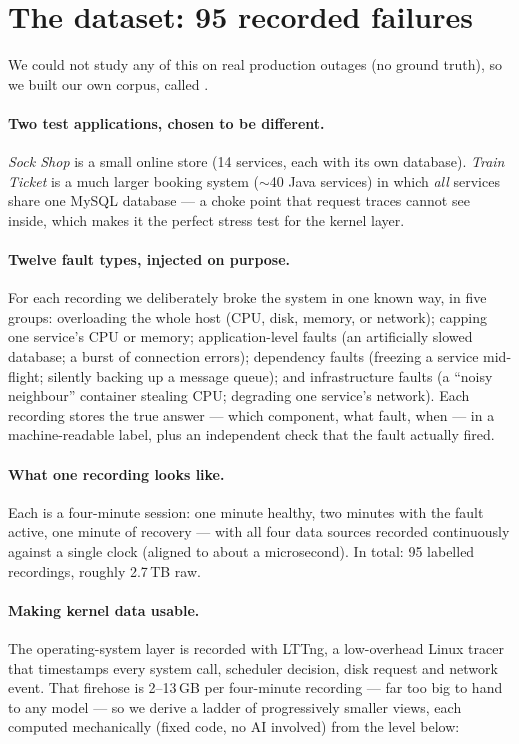 \section{The dataset: 95 recorded failures}
\label{sec:dataset}

We could not study any of this on real production outages (no ground truth), so we
built our own corpus, called \sys.

\paragraph{Two test applications, chosen to be different.} \emph{Sock Shop} is a
small online store (14 services, each with its own database). \emph{Train Ticket} is
a much larger booking system ($\sim$40 Java services) in which \emph{all} services
share one MySQL database --- a choke point that request traces cannot see inside,
which makes it the perfect stress test for the kernel layer.

\paragraph{Twelve fault types, injected on purpose.} For each recording we
deliberately broke the system in one known way, in five groups: overloading the whole
host (CPU, disk, memory, or network); capping one service's CPU or memory;
application-level faults (an artificially slowed database; a burst of connection
errors); dependency faults (freezing a service mid-flight; silently backing up a
message queue); and infrastructure faults (a ``noisy neighbour'' container stealing
CPU; degrading one service's network). Each recording stores the true answer ---
which component, what fault, when --- in a machine-readable label, plus an
independent check that the fault actually fired.

\paragraph{What one recording looks like.} Each is a four-minute session: one minute
healthy, two minutes with the fault active, one minute of recovery --- with all four
data sources recorded continuously against a single clock (aligned to about a
microsecond). In total: 95 labelled recordings, roughly 2.7\,TB raw.

\paragraph{Making kernel data usable.} The operating-system layer is recorded with
LTTng, a low-overhead Linux tracer that timestamps every system call, scheduler
decision, disk request and network event. That firehose is 2--13\,GB per four-minute
recording --- far too big to hand to any model --- so we derive a ladder of
progressively smaller views, each computed mechanically (fixed code, no AI involved)
from the level below:

